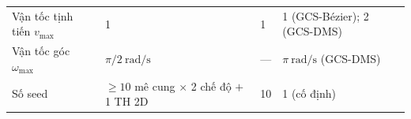 \begin{table}[!htp]
{\begin{tabular}{@{}p{3cm}p{3.8cm}p{2.6cm}p{4.6cm}@{}}
            \addlinespace[3pt]
            Vận tốc tịnh tiến $v_{\max}$
             & 1                                                                      & 1                   & 1 (GCS-Bézier); 2 (GCS-DMS)   \\
            \addlinespace[3pt]
            Vận tốc góc $\omega_{\max}$
             & $\pi/2\ \text{rad/s}$                                                  & ---                 & $\pi\ \text{rad/s}$ (GCS-DMS) \\
            \addlinespace[3pt]
            Số seed
             & ${\ge}10$ mê cung $\times$ 2 chế độ $+$ 1 TH 2D
             & 10                                                                     & 1 (cố định)                                         \\
            \bottomrule
        \end{tabular}
    }
\end{table}


